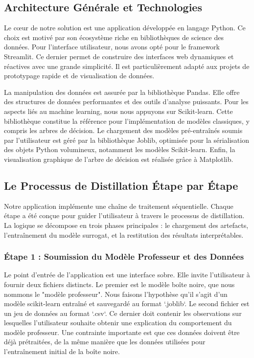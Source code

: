 \documentclass{article}
\begin{document}
\subsection{Architecture Générale et Technologies}

\quad Le cœur de notre solution est une application développée en langage Python. Ce choix est motivé par son écosystème riche en bibliothèques de science des données. Pour l'interface utilisateur, nous avons opté pour le framework Streamlit. Ce dernier permet de construire des interfaces web dynamiques et réactives avec une grande simplicité. Il est particulièrement adapté aux projets de prototypage rapide et de visualisation de données.

La manipulation des données est assurée par la bibliothèque Pandas. Elle offre des structures de données performantes et des outils d'analyse puissants. Pour les aspects liés au machine learning, nous nous appuyons sur Scikit-learn. Cette bibliothèque constitue la référence pour l'implémentation de modèles classiques, y compris les arbres de décision. Le chargement des modèles pré-entraînés soumis par l'utilisateur est géré par la bibliothèque Joblib, optimisée pour la sérialisation des objets Python volumineux, notamment les modèles Scikit-learn. Enfin, la visualisation graphique de l'arbre de décision est réalisée grâce à Matplotlib.

\subsection{Le Processus de Distillation Étape par Étape}

\quad Notre application implémente une chaîne de traitement séquentielle. Chaque étape a été conçue pour guider l'utilisateur à travers le processus de distillation. La logique se décompose en trois phases principales : le chargement des artefacts, l'entraînement du modèle surrogat, et la restitution des résultats interprétables.

\subsubsection{Étape 1 : Soumission du Modèle Professeur et des Données}

\quad Le point d'entrée de l'application est une interface sobre. Elle invite l'utilisateur à fournir deux fichiers distincts. Le premier est le modèle boîte noire, que nous nommons le "modèle professeur". Nous faisons l'hypothèse qu'il s'agit d'un modèle scikit-learn entraîné et sauvegardé au format `.joblib`. Le second fichier est un jeu de données au format `.csv`. Ce dernier doit contenir les observations sur lesquelles l'utilisateur souhaite obtenir une explication du comportement du modèle professeur. Une contrainte importante est que ces données doivent être déjà prétraitées, de la même manière que les données utilisées pour l'entraînement initial de la boîte noire.
\end{document}
